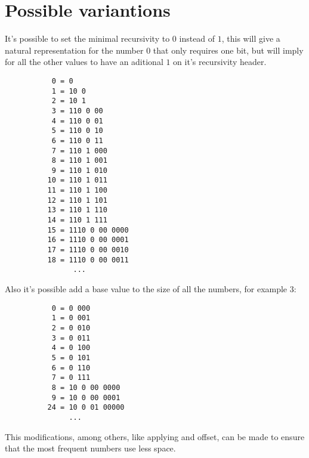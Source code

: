 \documentclass[a4paper,11pt]{article}
\begin{document}
\section{Possible variantions}
It's possible to set the minimal recursivity to $0$ instead of $1$, this will give a natural representation for the number $0$ that only requires one bit, but will imply for all the other values to have an aditional $1$ on it's recursivity header.
\begin{center} \begin{lstlisting}
           0 = 0
           1 = 10 0 
           2 = 10 1
           3 = 110 0 00
           4 = 110 0 01 
           5 = 110 0 10 
           6 = 110 0 11 
           7 = 110 1 000 
           8 = 110 1 001 
           9 = 110 1 010 
          10 = 110 1 011 
          11 = 110 1 100 
          12 = 110 1 101 
          13 = 110 1 110 
          14 = 110 1 111 
          15 = 1110 0 00 0000 
          16 = 1110 0 00 0001 
          17 = 1110 0 00 0010 
          18 = 1110 0 00 0011 
	      		...	
\end{lstlisting} \end{center}
Also it's possible add a base value to the size of all the numbers, for example $3$:
\begin{center} \begin{lstlisting}
           0 = 0 000
           1 = 0 001
           2 = 0 010
           3 = 0 011
           4 = 0 100
           5 = 0 101
           6 = 0 110
           7 = 0 111
           8 = 10 0 00 0000
           9 = 10 0 00 0001
          24 = 10 0 01 00000
           	   ...	
\end{lstlisting} \end{center}
This modifications, among others, like applying and offset, can be made to ensure that the most frequent numbers use less space.
\end{document}
